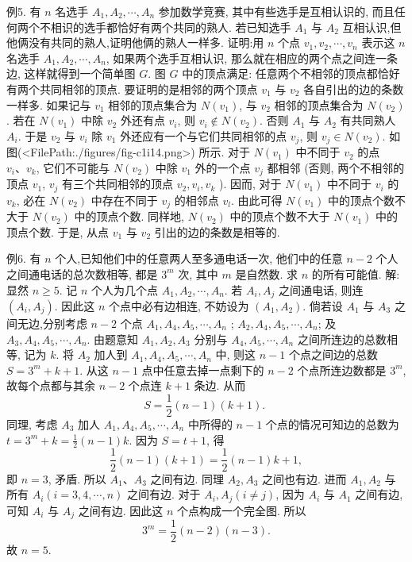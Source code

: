 例5. 有 $n$ 名选手 $A_1, A_2, \cdots, A_n$ 参加数学竞赛, 其中有些选手是互相认识的, 而且任何两个不相识的选手都恰好有两个共同的熟人.
若已知选手 $A_1$ 与 $A_2$ 互相认识,但他俩没有共同的熟人,证明他俩的熟人一样多.
证明:用 $n$ 个点 $v_1, v_2, \cdots, v_n$ 表示这 $n$ 名选手 $A_1, A_2, \cdots, A_n$, 如果两个选手互相认识, 那么就在相应的两个点之间连一条边, 这样就得到一个简单图 $G$. 图 $G$ 中的顶点满足: 任意两个不相邻的顶点都恰好有两个共同相邻的顶点.
要证明的是相邻的两个顶点 $v_1$ 与 $v_2$ 各自引出的边的条数一样多.
如果记与 $v_1$ 相邻的顶点集合为 $N\left(v_1\right)$, 与 $v_2$ 相邻的顶点集合为 $N\left(v_2\right)$. 若在 $N\left(v_1\right)$ 中除 $v_2$ 外还有点 $v_i$, 则 $v_i \notin N\left(v_2\right)$. 否则 $A_1$ 与 $A_2$ 有共同熟人 $A_i$. 于是 $v_2$ 与 $v_i$ 除 $v_1$ 外还应有一个与它们共同相邻的点 $v_j$, 则 $v_j \in N\left(v_2\right)$. 如图(<FilePath:./figures/fig-c1i14.png>) 所示.
对于 $N\left(v_1\right)$ 中不同于 $v_2$ 的点 $v_i 、 v_k$, 它们不可能与 $N\left(v_2\right)$ 中除 $v_1$ 外的一个点 $v_j$ 都相邻 (否则, 两个不相邻的顶点 $v_1$, $v_j$ 有三个共同相邻的顶点 $v_2, v_i, v_k$ ). 因而, 对于 $N\left(v_1\right)$ 中不同于 $v_i$ 的 $v_k$, 必在 $N\left(v_2\right)$ 中存在不同于 $v_j$ 的相邻点 $v_l$. 由此可得 $N\left(v_1\right)$ 中的顶点个数不大于 $N\left(v_2\right)$ 中的顶点个数.
同样地, $N\left(v_2\right)$ 中的顶点个数不大于 $N\left(v_1\right)$ 中的顶点个数.
于是, 从点 $v_1$ 与 $v_2$ 引出的边的条数是相等的.



例6. 有 $n$ 个人,已知他们中的任意两人至多通电话一次, 他们中的任意 $n-2$ 个人之间通电话的总次数相等, 都是 $3^m$ 次, 其中 $m$ 是自然数.
求 $n$ 的所有可能值.
解:显然 $n \geqslant 5$. 记 $n$ 个人为几个点 $A_1, A_2, \cdots, A_n$. 若 $A_i, A_j$ 之间通电话, 则连 $\left(A_i, A_j\right)$. 因此这 $n$ 个点中必有边相连, 不妨设为 $\left(A_1, A_2\right)$.
倘若设 $A_1$ 与 $A_3$ 之间无边,分别考虑 $n-2$ 个点 $A_1, A_4, A_5, \cdots, A_n$ ; $A_2, A_4, A_5, \cdots, A_n$; 及 $A_3, A_4, A_5, \cdots, A_n$. 由题意知 $A_1, A_2, A_3$ 分别与 $A_4, A_5, \cdots, A_n$ 之间所连边的总数相等, 记为 $k$.
将 $A_2$ 加人到 $A_1, A_4, A_5, \cdots, A_n$ 中, 则这 $n-1$ 个点之间边的总数 $S= 3^m+k+1$. 从这 $n-1$ 点中任意去掉一点剩下的 $n-2$ 个点所连边数都是 $3^m$, 故每个点都与其余 $n-2$ 个点连 $k+1$ 条边.
从而
$$
S=\frac{1}{2}(n-1)(k+1) \text {. }
$$
同理, 考虑 $A_3$ 加人 $A_1, A_4, A_5, \cdots, A_n$ 中所得的 $n-1$ 个点的情况可知边的总数为 $t=3^m+k=\frac{1}{2}(n-1) k$.
因为 $S=t+1$, 得
$$
\frac{1}{2}(n-1)(k+1)=\frac{1}{2}(n-1) k+1,
$$
即 $n=3$, 矛盾.
所以 $A_1 、 A_3$ 之间有边.
同理 $A_2, A_3$ 之间也有边.
进而 $A_1, A_2$ 与所有 $A_i(i=3,4, \cdots, n)$ 之间有边.
对于 $A_i, A_j(i \neq j)$, 因为 $A_i$ 与 $A_1$ 之间有边, 可知 $A_i$ 与 $A_j$ 之间有边.
因此这 $n$ 个点构成一个完全图.
所以
$$
3^m=\frac{1}{2}(n-2)(n-3) .
$$
故 $n=5$.



